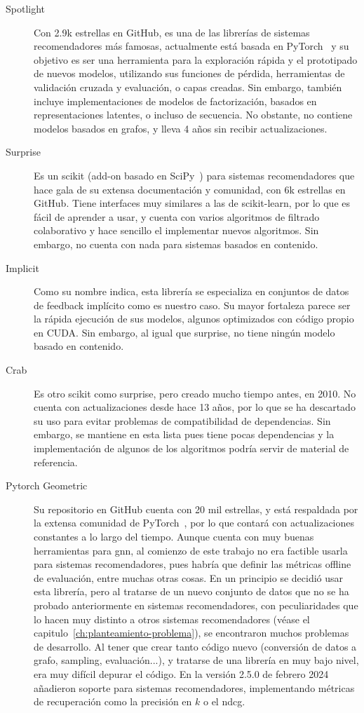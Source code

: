 \begin{description}
    \item [Spotlight~\cite{kula_spotlight_2017}] Con 2.9k estrellas en GitHub, es una de las librerías de sistemas recomendadores más famosas, actualmente está basada en PyTorch~\cite{paszke_pytorch_2019} y su objetivo es ser una herramienta para la exploración rápida y el prototipado de nuevos modelos, utilizando sus funciones de pérdida, herramientas de validación cruzada  y evaluación, o capas creadas. Sin embargo, también incluye implementaciones de modelos de factorización, basados en representaciones latentes, o incluso de secuencia. No obstante, no contiene modelos basados en grafos, y lleva 4 años sin recibir actualizaciones.
    \item [Surprise~\cite{hug_surprise_2020}] Es un scikit (add-on basado en SciPy~\cite{virtanen_scipy_2020}) para sistemas recomendadores que hace gala de su extensa documentación y comunidad, con 6k estrellas en GitHub. Tiene interfaces muy similares a las de scikit-learn, por lo que es fácil de aprender a usar, y cuenta con varios algoritmos de filtrado colaborativo y hace sencillo el implementar nuevos algoritmos. Sin embargo, no cuenta con nada para sistemas basados en contenido.
    \item [Implicit~\cite{frederickson_implicit_2018}] Como su nombre indica, esta librería se especializa en conjuntos de datos de feedback implícito como es nuestro caso. Su mayor fortaleza parece ser la rápida ejecución de sus modelos, algunos optimizados con código propio en CUDA. Sin embargo, al igual que surprise, no tiene ningún modelo basado en contenido.
    \item [Crab~\cite{caraciolo_crab_2010}] Es otro scikit como surprise, pero creado mucho tiempo antes, en 2010. No cuenta con actualizaciones desde hace 13 años, por lo que se ha descartado su uso para evitar problemas de compatibilidad de dependencias. Sin embargo, se mantiene en esta lista pues tiene pocas dependencias y la implementación de algunos de los algoritmos podría servir de material de referencia.
    \item [Pytorch Geometric~\cite{fey_fast_2019}] Su repositorio en GitHub cuenta con 20 mil estrellas, y está respaldada por la extensa comunidad de PyTorch~\cite{paszke_pytorch_2019}, por lo que contará con actualizaciones constantes a lo largo del tiempo. Aunque cuenta con muy buenas herramientas para \gls{gnn}, al comienzo de este trabajo no era factible usarla para sistemas recomendadores, pues habría que definir las métricas offline de evaluación, entre muchas otras cosas. En un principio se decidió usar esta librería, pero al tratarse de un nuevo conjunto de datos que no se ha probado anteriormente en sistemas recomendadores, con peculiaridades que lo hacen muy distinto a otros sistemas recomendadores (véase el capitulo~\ref{ch:planteamiento-problema}), se encontraron muchos problemas de desarrollo. Al tener que crear tanto código nuevo (conversión de datos a grafo, sampling, evaluación...), y tratarse de una librería en muy bajo nivel, era muy difícil depurar el código. En la versión 2.5.0 de febrero 2024 añadieron soporte para sistemas recomendadores, implementando métricas de recuperación como la precisión en $k$ o el \acrshort{ndcg}.

\end{description}
